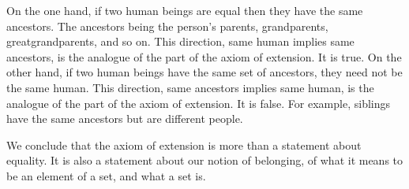 On the one hand, if two human beings are equal then they have the same ancestors.
The ancestors being the person's parents, grandparents, greatgrandparents, and so on.
This direction, same human implies same ancestors, is the analogue of the  part of the axiom of extension.
It is true.
On the other hand, if two human beings have the same set of ancestors, they need not be the same human.
This direction, same ancestors implies same human, is the analogue of the  part of the axiom of extension.
It is false.
For example, siblings have the same ancestors but are different people.

We conclude that the axiom of extension
is more than a statement about equality.
It is also a statement about our notion of
belonging, of what it means
to be an element of a set, and what a set is.

\blankpage
